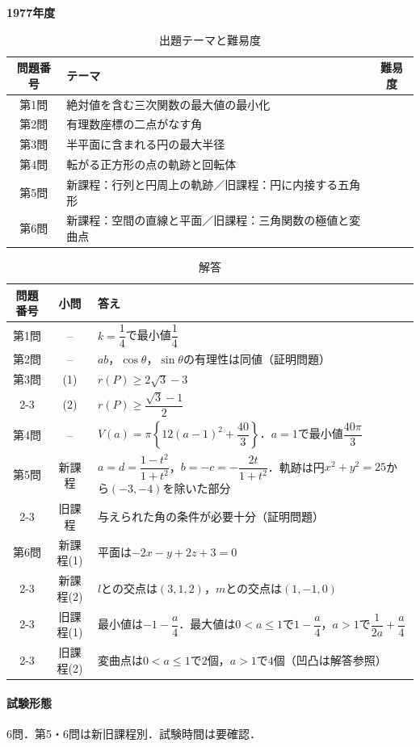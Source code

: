 \documentclass[../../main.tex]{subfiles}
\begin{document}
\begin{center}
  {\fontsize{48pt}{58pt}\selectfont \textbf{1977}\normalsize\textbf{年度}}
\end{center}

\begin{table}[htb]
  \centering
  \caption{出題テーマと難易度}
  \begin{tabular}{|c|p{9cm}|c|}
    \hline
    \textbf{問題番号} & \textbf{テーマ} & \textbf{難易度} \\
    \hline
    第1問 & 絶対値を含む三次関数の最大値の最小化 & \\
    \hline
    第2問 & 有理数座標の二点がなす角 & \\
    \hline
    第3問 & 半平面に含まれる円の最大半径 & \\
    \hline
    第4問 & 転がる正方形の点の軌跡と回転体 & \\
    \hline
    第5問 & 新課程：行列と円周上の軌跡／旧課程：円に内接する五角形 & \\
    \hline
    第6問 & 新課程：空間の直線と平面／旧課程：三角関数の極値と変曲点 & \\
    \hline
  \end{tabular}
\end{table}

\begin{table}[htb]
  \centering
  \caption{解答}
  \renewcommand{\arraystretch}{1.4}
  \begin{tabular}{|c|c|p{9cm}|}
    \hline
    \textbf{問題番号} & \textbf{小問} & \textbf{答え} \\
    \hline
    第1問 & -- & $k=\dfrac{1}{4}$で最小値$\dfrac{1}{4}$ \\
    \hline
    第2問 & -- & $ab$，$\cos\theta$，$\sin\theta$の有理性は同値（証明問題） \\
    \hline
    第3問 & (1) & $r(P)\ge 2\sqrt{3}-3$ \\
    \cline{2-3}
    & (2) & $r(P)\ge\dfrac{\sqrt{3}-1}{2}$ \\
    \hline
    第4問 & -- & $V(a)=\pi\left\{12(a-1)^2+\dfrac{40}{3}\right\}$．$a=1$で最小値$\dfrac{40\pi}{3}$ \\
    \hline
    第5問 & 新課程 & $a=d=\dfrac{1-t^2}{1+t^2}$，$b=-c=-\dfrac{2t}{1+t^2}$．軌跡は円$x^2+y^2=25$から$(-3,-4)$を除いた部分 \\
    \cline{2-3}
    & 旧課程 & 与えられた角の条件が必要十分（証明問題） \\
    \hline
    第6問 & 新課程(1) & 平面は$-2x-y+2z+3=0$ \\
    \cline{2-3}
    & 新課程(2) & $l$との交点は$(3,1,2)$，$m$との交点は$(1,-1,0)$ \\
    \cline{2-3}
    & 旧課程(1) & 最小値は$-1-\dfrac{a}{4}$．最大値は$0<a\le1$で$1-\dfrac{a}{4}$，$a>1$で$\dfrac{1}{2a}+\dfrac{a}{4}$ \\
    \cline{2-3}
    & 旧課程(2) & 変曲点は$0<a\le1$で$2$個，$a>1$で$4$個（凹凸は解答参照） \\
    \hline
  \end{tabular}
\end{table}

\paragraph{試験形態}
6問．第5・6問は新旧課程別．試験時間は要確認．
\end{document}
